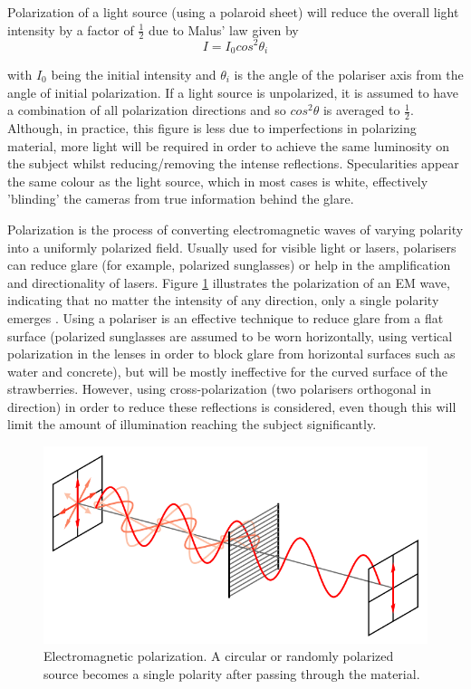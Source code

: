 \documentclass[fleqn,twoside,12pt]{report}
\begin{document}
Polarization of a light source (using a polaroid sheet) will reduce the overall light intensity by a factor of $\frac{1}{2}$ due to Malus' law given by
\begin{equation}
I = I_{0} cos^{2}\theta_{i}
\end{equation}

with $I_{0}$ being the initial intensity and $\theta_{i}$ is the angle of the polariser axis from the angle of initial polarization. If a light source is unpolarized, it is assumed to have a combination of all polarization directions and so $cos^{2}\theta$ is averaged to $\frac{1}{2}$. Although, in practice, this figure is less due to imperfections in polarizing material, more light will be required in order to achieve the same luminosity on the subject \cite{rox, sommer} whilst reducing/removing the intense reflections. Specularities appear the same colour as the light source, which in most cases is white, effectively 'blinding' the cameras from true information behind the glare.  


Polarization is the process of converting electromagnetic waves of varying polarity into a uniformly polarized field. Usually used for visible light or lasers, polarisers can reduce glare (for example, polarized sunglasses) or help in the amplification and directionality of lasers. Figure \ref{fig:polarization} illustrates the polarization of an EM wave, indicating that no matter the intensity of any direction, only a single polarity emerges  \cite{physicsopenlab}. Using a polariser is an effective technique to reduce glare from a flat surface (polarized sunglasses are assumed to be worn horizontally, using vertical polarization in the lenses in order to block glare from horizontal surfaces such as water and concrete), but will be mostly ineffective for the curved surface of the strawberries. However, using cross-polarization (two polarisers orthogonal in direction) in order to reduce these reflections is considered, even though this will limit the amount of illumination reaching the subject significantly.

\begin{figure}[h]
	\centering
	\includegraphics[width=.8\linewidth]{polarization.png}
	\caption{Electromagnetic polarization. A circular or randomly polarized source becomes a single polarity after passing through the material.}
	\label{fig:polarization}
\end{figure}%
\end{document}

